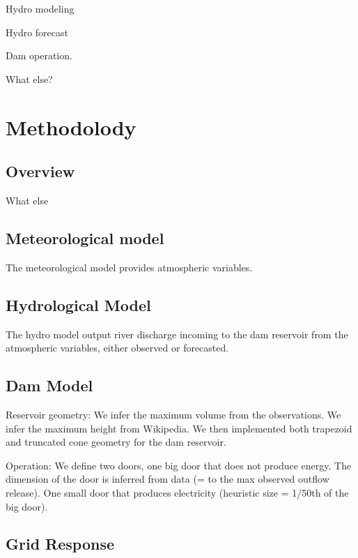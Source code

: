 \documentclass{article}
\begin{document}
Hydro modeling

Hydro forecast

Dam operation.

What else?

\section{Methodolody}
\label{sec:Methodolody}

\subsection{Overview}
\label{sec:Overview}

What else

\subsection{Meteorological model}
\label{sec:Meteorological model}

The meteorological model provides atmospheric variables.


\subsection{Hydrological Model}
\label{Hydrological Model}

The hydro model output river discharge incoming to the dam reservoir 
from the atmospheric variables, either observed or forecasted. 

\subsection{Dam Model}
\label{Dam Model}

Reservoir geometry: We infer the maximum volume from the observations. 
We infer the maximum height from Wikipedia. We then implemented both trapezoid and truncated cone geometry for the dam reservoir. 

Operation: We define two doors, one big door that does not produce energy. 
The dimension of the door is inferred from data (= to the max observed outflow release). 
One small door that produces electricity (heuristic size = 1/50th of the big door).


\subsection{Grid Response}
\label{Grid Response}
\end{document}
